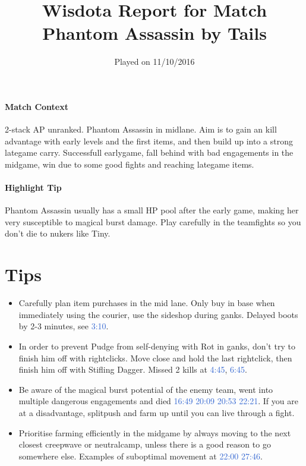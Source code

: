 \documentclass{article}
\title{Wisdota Report for Match \matchid \\
Phantom Assassin by Tails}
\date{Played on 11/10/2016}
\author{}
\newcommand{\logref}[1]{\textcolor{highlight}{#1}}
\begin{document}
\pagecolor{WisdotaBackground}
\color{white}

\maketitle
\thispagestyle{first-page}

\paragraph{Match Context}
2-stack AP unranked. Phantom Assassin in midlane. Aim is to gain an kill advantage with early levels and the 
first items, and then build up into a strong lategame carry. Successfull earlygame, fall behind with bad engagements in the midgame, win due to some good fights and reaching lategame items.
\paragraph{Highlight Tip}
Phantom Assassin usually has a small HP pool after the early game, making her very susceptible to magical burst damage. Play carefully in the teamfights so you don't die to nukers like Tiny.


\section{Tips}

\begin{itemize}
    \item Carefully plan item purchases in the mid lane. Only buy in base when immediately using the courier, use the sideshop during ganks. Delayed boots by 2-3 minutes, see \logref{3:10}.
    \item In order to prevent Pudge from self-denying with Rot in ganks, don't try to finish him off with rightclicks. Move close and hold the last rightclick, then finish him off with Stifling Dagger. Missed 2 kills at \logref{4:45}, \logref{6:45}.
    \item Be aware of the magical burst potential of the enemy team, went into multiple dangerous engagements and died \logref{16:49} \logref{20:09} \logref{20:53} \logref{22:21}. If you are at a disadvantage, splitpush and farm up until you can live through a fight.
    \item Prioritise farming efficiently in the midgame by always moving to the next closest creepwave or neutralcamp, unless there is a good reason to go somewhere else. Examples of suboptimal movement at \logref{22:00} \logref{27:46}.
\end{itemize}
\end{document}
